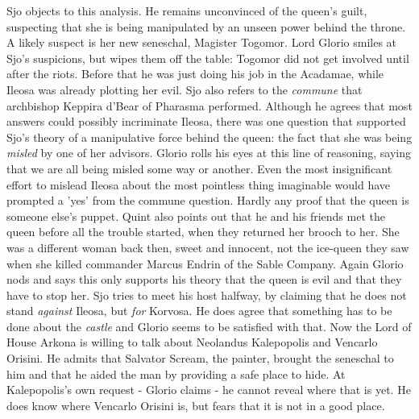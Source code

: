 Sjo objects to this analysis. He remains unconvinced of the queen's guilt, suspecting that she is being manipulated by an unseen power behind the throne. A likely suspect is her new seneschal, Magister Togomor. Lord Glorio smiles at Sjo's suspicions, but wipes them off the table: Togomor did not get involved until after the riots. Before that he was just doing his job in the Acadamae, while Ileosa was already plotting her evil. Sjo also refers to the {\itshape commune} that archbishop Keppira d'Bear of Pharasma performed. Although he agrees that most answers could possibly incriminate Ileosa, there was one question that supported Sjo's theory of a manipulative force behind the queen: the fact that she was being  {\itshape misled} by one of her advisors. Glorio rolls his eyes at this line of reasoning, saying that we are all being misled some way or another. Even the most insignificant effort to mislead Ileosa about the most pointless thing imaginable would have prompted a 'yes' from the commune question. Hardly any proof that the queen is someone else's puppet. Quint also points out that he and his friends met the queen before all the trouble started, when they returned her brooch to her. She was a different woman back then, sweet and innocent, not the ice-queen they saw when she killed commander Marcus Endrin of the Sable Company. Again Glorio nods and says this only supports his theory that the queen is evil and that they have to stop her. Sjo tries to meet his host halfway, by claiming that he does not stand {\itshape against} Ileosa, but  {\itshape for} Korvosa. He does agree that something has to be done about the  {\itshape castle} and Glorio seems to be satisfied with that. Now the Lord of House Arkona is willing to talk about Neolandus Kalepopolis and Vencarlo Orisini. He admits that Salvator Scream, the painter, brought the seneschal to him and that he aided the man by providing a safe place to hide. At Kalepopolis's own request - Glorio claims - he cannot reveal where that is yet. He does know where Vencarlo Orisini is, but fears that it is not in a good place.\\

